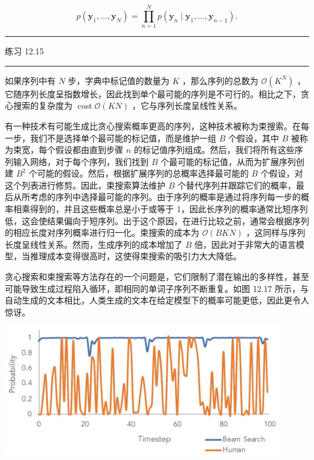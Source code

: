 \documentclass[10pt]{article}
\newcommand{\HRule}{\begin{center}\rule{0.9\linewidth}{0.2mm}\end{center}}
\begin{document}
\[
p\left( {{\mathbf{y}}_{1},\ldots ,{\mathbf{y}}_{N}}\right)  = \mathop{\prod }\limits_{{n = 1}}^{N}p\left( {{\mathbf{y}}_{n} \mid  {\mathbf{y}}_{1},\ldots ,{\mathbf{y}}_{n - 1}}\right) . \tag{12.34}
\]

\HRule

练习 12.15

\HRule

如果序列中有 \(N\) 步，字典中标记值的数量为 \(K\) ，那么序列的总数为 \(\mathcal{O}\left( {K}^{N}\right)\) ，它随序列长度呈指数增长，因此找到单个最可能的序列是不可行的。相比之下，贪心搜索的复杂度为 \(\operatorname{cost}\mathcal{O}\left( {KN}\right)\) ，它与序列长度呈线性关系。

有一种技术有可能生成比贪心搜索概率更高的序列，这种技术被称为束搜索。在每一步，我们不是选择单个最可能的标记值，而是维护一组 \(B\) 个假设，其中 \(B\) 被称为束宽，每个假设都由直到步骤 \(n\) 的标记值序列组成。然后，我们将所有这些序列输入网络，对于每个序列，我们找到 \(B\) 个最可能的标记值，从而为扩展序列创建 \({B}^{2}\) 个可能的假设。然后，根据扩展序列的总概率选择最可能的 \(B\) 个假设，对这个列表进行修剪。因此，束搜索算法维护 \(B\) 个替代序列并跟踪它们的概率，最后从所考虑的序列中选择最可能的序列。由于序列的概率是通过将序列每一步的概率相乘得到的，并且这些概率总是小于或等于 1，因此长序列的概率通常比短序列低，这会使结果偏向于短序列。出于这个原因，在进行比较之前，通常会根据序列的相应长度对序列概率进行归一化。束搜索的成本为 \(\mathcal{O}\left( {BKN}\right)\) ，这同样与序列长度呈线性关系。然而，生成序列的成本增加了 \(B\) 倍，因此对于非常大的语言模型，当推理成本变得很高时，这使得束搜索的吸引力大大降低。

贪心搜索和束搜索等方法存在的一个问题是，它们限制了潜在输出的多样性，甚至可能导致生成过程陷入循环，即相同的单词子序列不断重复。如图 12.17 所示，与自动生成的文本相比，人类生成的文本在给定模型下的概率可能更低，因此更令人惊讶。

\begin{center}
\includegraphics[max width=0.9\textwidth]{images/0194e279-9b28-703a-88f4-c3ac21e2010d_406_319_382_1145_538_0.jpg}
\end{center}
\hspace*{3em} 
\end{document}
